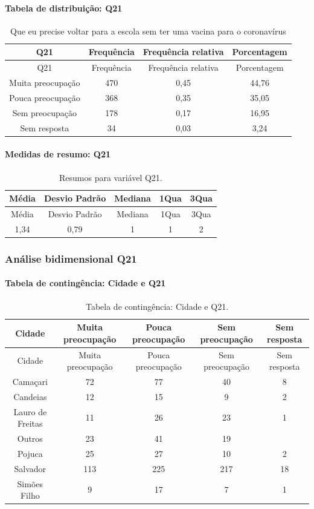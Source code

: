 \documentclass[]{article}
\let\oldparagraph\paragraph
\renewcommand{\paragraph}[1]{\oldparagraph{#1}\mbox{}}
\begin{document}
\hypertarget{tabela-de-distribuiuxe7uxe3o-q21}{%
\paragraph{Tabela de distribuição: Q21}\label{tabela-de-distribuiuxe7uxe3o-q21}}

\begin{longtable}[]{@{}cccc@{}}
\caption{\label{tab:unnamed-chunk-424}Que eu precise voltar para a escola sem ter uma vacina para o coronavírus}\tabularnewline
\toprule
Q21 & Frequência & Frequência relativa & Porcentagem\tabularnewline
\midrule
\endfirsthead
\toprule
Q21 & Frequência & Frequência relativa & Porcentagem\tabularnewline
\midrule
\endhead
Muita preocupação & 470 & 0,45 & 44,76\tabularnewline
Pouca preocupação & 368 & 0,35 & 35,05\tabularnewline
Sem preocupação & 178 & 0,17 & 16,95\tabularnewline
Sem resposta & 34 & 0,03 & 3,24\tabularnewline
\bottomrule
\end{longtable}

\hypertarget{medidas-de-resumo-q21}{%
\paragraph{Medidas de resumo: Q21}\label{medidas-de-resumo-q21}}

\begin{longtable}[]{@{}ccccc@{}}
\caption{\label{tab:unnamed-chunk-425}Resumos para variável Q21.}\tabularnewline
\toprule
Média & Desvio Padrão & Mediana & 1Qua & 3Qua\tabularnewline
\midrule
\endfirsthead
\toprule
Média & Desvio Padrão & Mediana & 1Qua & 3Qua\tabularnewline
\midrule
\endhead
1,34 & 0,79 & 1 & 1 & 2\tabularnewline
\bottomrule
\end{longtable}

\cleardoublepage

\hypertarget{anuxe1lise-bidimensional-q21}{%
\subsubsection{Análise bidimensional Q21}\label{anuxe1lise-bidimensional-q21}}

\hypertarget{tabela-de-continguxeancia-cidade-e-q21}{%
\paragraph{Tabela de contingência: Cidade e Q21}\label{tabela-de-continguxeancia-cidade-e-q21}}

\begin{longtable}[]{@{}ccccc@{}}
\caption{\label{tab:unnamed-chunk-426}Tabela de contingência: Cidade e Q21.}\tabularnewline
\toprule
Cidade & Muita preocupação & Pouca preocupação & Sem preocupação & Sem resposta\tabularnewline
\midrule
\endfirsthead
\toprule
Cidade & Muita preocupação & Pouca preocupação & Sem preocupação & Sem resposta\tabularnewline
\midrule
\endhead
Camaçari & 72 & 77 & 40 & 8\tabularnewline
Candeias & 12 & 15 & 9 & 2\tabularnewline
Lauro de Freitas & 11 & 26 & 23 & 1\tabularnewline
Outros & 23 & 41 & 19 &\tabularnewline
Pojuca & 25 & 27 & 10 & 2\tabularnewline
Salvador & 113 & 225 & 217 & 18\tabularnewline
Simões Filho & 9 & 17 & 7 & 1\tabularnewline
\bottomrule
\end{longtable}
\end{document}
